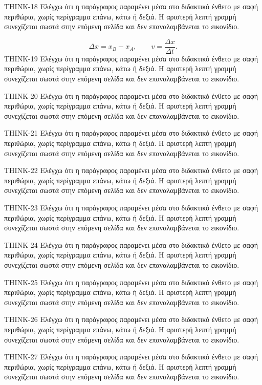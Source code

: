 \begin{ThinkBox}
THINK-18 Ελέγχω ότι η παράγραφος παραμένει μέσα στο διδακτικό ένθετο με σαφή περιθώρια, χωρίς περίγραμμα επάνω, κάτω ή δεξιά. Η αριστερή λεπτή γραμμή συνεχίζεται σωστά στην επόμενη σελίδα και δεν επαναλαμβάνεται το εικονίδιο.\par
\[\Delta x=x_B-x_A,\qquad v=\frac{\Delta x}{\Delta t}.\]
THINK-19 Ελέγχω ότι η παράγραφος παραμένει μέσα στο διδακτικό ένθετο με σαφή περιθώρια, χωρίς περίγραμμα επάνω, κάτω ή δεξιά. Η αριστερή λεπτή γραμμή συνεχίζεται σωστά στην επόμενη σελίδα και δεν επαναλαμβάνεται το εικονίδιο.\par
THINK-20 Ελέγχω ότι η παράγραφος παραμένει μέσα στο διδακτικό ένθετο με σαφή περιθώρια, χωρίς περίγραμμα επάνω, κάτω ή δεξιά. Η αριστερή λεπτή γραμμή συνεχίζεται σωστά στην επόμενη σελίδα και δεν επαναλαμβάνεται το εικονίδιο.\par
THINK-21 Ελέγχω ότι η παράγραφος παραμένει μέσα στο διδακτικό ένθετο με σαφή περιθώρια, χωρίς περίγραμμα επάνω, κάτω ή δεξιά. Η αριστερή λεπτή γραμμή συνεχίζεται σωστά στην επόμενη σελίδα και δεν επαναλαμβάνεται το εικονίδιο.\par
THINK-22 Ελέγχω ότι η παράγραφος παραμένει μέσα στο διδακτικό ένθετο με σαφή περιθώρια, χωρίς περίγραμμα επάνω, κάτω ή δεξιά. Η αριστερή λεπτή γραμμή συνεχίζεται σωστά στην επόμενη σελίδα και δεν επαναλαμβάνεται το εικονίδιο.\par
THINK-23 Ελέγχω ότι η παράγραφος παραμένει μέσα στο διδακτικό ένθετο με σαφή περιθώρια, χωρίς περίγραμμα επάνω, κάτω ή δεξιά. Η αριστερή λεπτή γραμμή συνεχίζεται σωστά στην επόμενη σελίδα και δεν επαναλαμβάνεται το εικονίδιο.\par
THINK-24 Ελέγχω ότι η παράγραφος παραμένει μέσα στο διδακτικό ένθετο με σαφή περιθώρια, χωρίς περίγραμμα επάνω, κάτω ή δεξιά. Η αριστερή λεπτή γραμμή συνεχίζεται σωστά στην επόμενη σελίδα και δεν επαναλαμβάνεται το εικονίδιο.\par
THINK-25 Ελέγχω ότι η παράγραφος παραμένει μέσα στο διδακτικό ένθετο με σαφή περιθώρια, χωρίς περίγραμμα επάνω, κάτω ή δεξιά. Η αριστερή λεπτή γραμμή συνεχίζεται σωστά στην επόμενη σελίδα και δεν επαναλαμβάνεται το εικονίδιο.\par
THINK-26 Ελέγχω ότι η παράγραφος παραμένει μέσα στο διδακτικό ένθετο με σαφή περιθώρια, χωρίς περίγραμμα επάνω, κάτω ή δεξιά. Η αριστερή λεπτή γραμμή συνεχίζεται σωστά στην επόμενη σελίδα και δεν επαναλαμβάνεται το εικονίδιο.\par
THINK-27 Ελέγχω ότι η παράγραφος παραμένει μέσα στο διδακτικό ένθετο με σαφή περιθώρια, χωρίς περίγραμμα επάνω, κάτω ή δεξιά. Η αριστερή λεπτή γραμμή συνεχίζεται σωστά στην επόμενη σελίδα και δεν επαναλαμβάνεται το εικονίδιο.\par

\end{ThinkBox}
